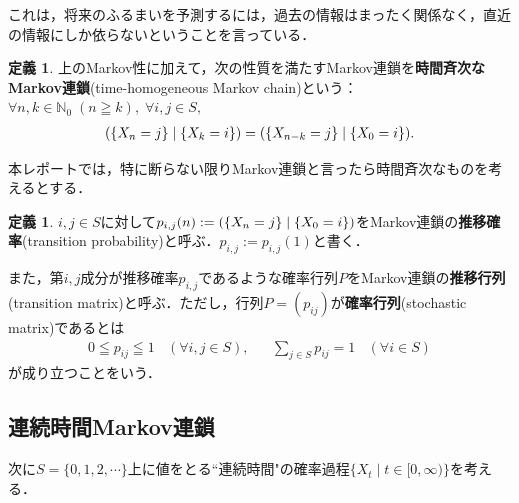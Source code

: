 \documentclass[dvipdfmx]{jsarticle}
\numberwithin{equation}{section}
\theoremstyle{definition}
\newtheorem{dfn}[thm]{定義}
\newcommand{\N}{\mathbb{N}}
\let\P\relax
\newcommand{\P}{\mathbb{P}}
\newcommand{\0}{\bm{0}}
\newcommand{\1}{\bm{1}}
\begin{document}
これは，将来のふるまいを予測するには，過去の情報はまったく関係なく，直近の情報にしか依らないということを言っている．

\begin{dfn}
  上のMarkov性に加えて，次の性質を満たすMarkov連鎖を{\bf 時間斉次なMarkov連鎖}(time-homogeneous Markov chain)という：$\forall n, k \in \N_0 \; (n \geqq k), \; \forall i, j \in S,$
  \begin{align}
    \P( \{X_n = j\} \mid \{X_k = i\} ) = \P( \{X_{n-k} = j\} \mid \{X_0 = i\} ).
  \end{align}
\end{dfn}

本レポートでは，特に断らない限りMarkov連鎖と言ったら時間斉次なものを考えるとする．

\begin{dfn}
  $i,j \in S$に対して$p_{i,j}(n) := \P( \{X_n = j\} \mid \{X_0 = i\} )$をMarkov連鎖の{\bf 推移確率}(transition probability)と呼ぶ．$p_{i,j} := p_{i,j}(1)$と書く．
  
  また，第$i,j$成分が推移確率$p_{i,j}$であるような確率行列$P$をMarkov連鎖の{\bf 推移行列}(transition matrix)と呼ぶ．ただし，行列$P = (p_{ij})$が{\bf 確率行列}(stochastic matrix)であるとは
  \begin{align}
    0 \leqq p_{ij} \leqq 1 ~~~~ (\forall i,j \in S), && \sum_{j \in S} p_{ij} = 1 ~~~~ (\forall i \in S)
  \end{align}
  が成り立つことをいう．
\end{dfn}

\subsection{連続時間Markov連鎖}
次に$S = \{0,1,2, \cdots \}$上に値をとる``連続時間"の確率過程$\{X_t \mid t \in [0, \infty) \}$を考える．
\end{document}
